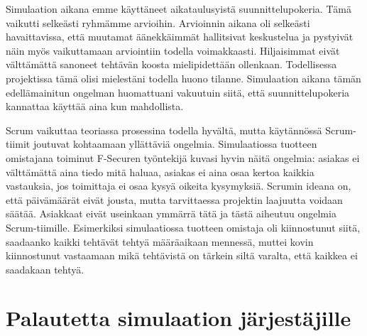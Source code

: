 \documentclass[a4paper]{article}
\begin{document}
Simulaation aikana emme käyttäneet aikataulusyistä suunnittelupokeria. Tämä vaikutti selkeästi ryhmämme arvioihin. Arvioinnin aikana oli selkeästi havaittavissa, että muutamat äänekkäimmät hallitsivat keskustelua ja pystyivät näin myös vaikuttamaan arviointiin todella voimakkaasti. Hiljaisimmat eivät välttämättä sanoneet tehtävän koosta mielipidettään ollenkaan. Todellisessa projektissa tämä olisi mielestäni todella huono tilanne. Simulaation aikana tämän edellämainitun ongelman huomattuani vakuutuin siitä, että suunnittelupokeria kannattaa käyttää aina kun mahdollista.

Scrum vaikuttaa teoriassa prosessina todella hyvältä, mutta käytännössä Scrum-tiimit joutuvat kohtaamaan yllättäviä ongelmia. Simulaatiossa tuotteen omistajana toiminut F-Securen työntekijä kuvasi hyvin näitä ongelmia: asiakas ei välttämättä aina tiedo mitä haluaa, asiakas ei aina osaa kertoa kaikkia vastauksia, jos toimittaja ei osaa kysyä oikeita kysymyksiä. Scrumin ideana on, että päivämäärät eivät jousta, mutta tarvittaessa projektin laajuutta voidaan säätää. Asiakkaat eivät useinkaan ymmärrä tätä ja tästä aiheutuu ongelmia Scrum-tiimille. Esimerkiksi simulaatiossa tuotteen omistaja oli kiinnostunut siitä, saadaanko kaikki tehtävät tehtyä määräaikaan mennessä, muttei kovin kiinnostunut vastaamaan mikä tehtävistä on tärkein siltä varalta, että kaikkea ei saadakaan tehtyä.


\section{Palautetta simulaation järjestäjille}
\end{document}
